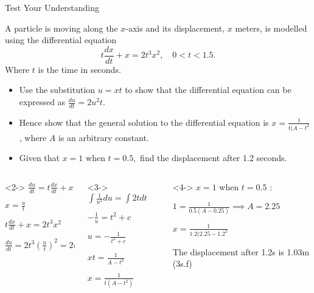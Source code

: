 \documentclass[8pt]{beamer}
\begin{document}
\begin{frame}[shrink]{Test Your Understanding}
	\begin{problem}
		A particle is moving along the $x$-axis and its displacement, $x$ meters, is modelled using the differential equation 
		\[
		t \frac{dx}{dt} +x = 2t^3x^2, \quad 0<t<1.5
		.\]
		Where $t$ is the time in seconds.
		\begin{itemize}
			\item Use the substitution $u=xt$ to show that the differential equation can be expressed as $\frac{du}{dt}=2u^2t$.
			\item Hence show that the general solution to the differential equation is $ x= \frac{1}{t(A-t^2}$, where $A$ is an arbitrary constant.
			\item Given that $x=1$ when $t=0.5,$ find the displacement after 1.2 seconds.
		\end{itemize}

	\end{problem}
	\begin{columns}[T]
	\begin{column}{.3\linewidth}
	\begin{solution}<2->
		$\frac{du}{dt}=t \frac{dx}{dt}+x$

		$x=\frac{u}{t}$ 

		$t \frac{dx}{dt} + x= 2t^3x^2$ 

		$\frac{du}{dt}=2t^3\left( \frac{u}{t} \right)^2=2u^2t $
	\end{solution}
	\end{column}
	\begin{column}{.3\linewidth}
		\begin{solution}<3->
	$\int \frac{1}{u^2}du=\int 2t dt$

	$-\frac{1}{u}=t^2+c$

	$u=-\frac{1}{t^2+c}$

	$xt=\frac{1}{A-t^2}$

	$x=\frac{1}{t(A-t^2)}$
	\end{solution}
	\end{column}
	\begin{column}{.4\textwidth}
		\begin{solution}<4->
			$x=1$ when $t=0.5$ :

			$1=\frac{1}{0.5(A-0.25)} \implies A =2.25$

			$x=\frac{1}{1.2(2.25-1.2^2}$ 

			The displacement after 1.2s is 1.03m (3s.f)
		\end{solution}
	\end{column}
	\end{columns}
\end{frame}
\end{document}
